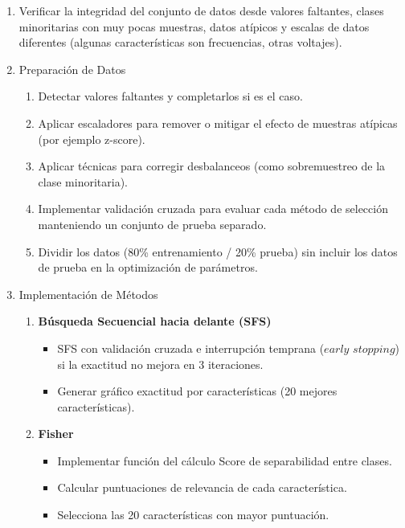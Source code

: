 \begin{enumerate}
    \item Verificar la integridad del conjunto de datos desde valores faltantes, clases minoritarias con muy pocas muestras, datos
          atípicos y escalas de datos diferentes (algunas características son frecuencias, otras voltajes).

    \item{Preparación de Datos}
          \begin{enumerate}
              \item Detectar valores faltantes y completarlos si es el caso.
              \item  Aplicar escaladores para remover o mitigar el efecto de muestras atípicas (por ejemplo z-score).
              \item  Aplicar técnicas para corregir desbalanceos (como sobremuestreo de la clase minoritaria).
              \item Implementar validación cruzada para evaluar cada método de selección manteniendo un conjunto de prueba separado.
              \item  Dividir los datos (80\% entrenamiento / 20\% prueba) sin incluir los datos de prueba en la optimización de parámetros.
          \end{enumerate}

    \item{Implementación de Métodos}
          \begin{enumerate}
              \item \textbf{Búsqueda Secuencial hacia delante (SFS)}
                    \begin{itemize}
                        \item SFS con validación cruzada e interrupción temprana ($early$ $stopping$) si la exactitud no mejora en 3 iteraciones.
                        \item Generar gráfico exactitud por características (20 mejores características).
                    \end{itemize}

              \item \textbf{Fisher}
                    \begin{itemize}
                        \item Implementar función del cálculo  Score de separabilidad entre clases.
                        \item Calcular puntuaciones de relevancia de cada característica.
                        \item Selecciona las 20 características con mayor puntuación.
                    \end{itemize}


\end{enumerate}
\end{enumerate}
